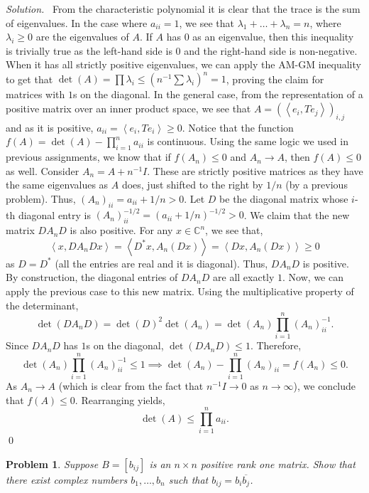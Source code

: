 \documentclass[12pt,a4paper]{article}
\newenvironment{solution}{%
  \par\noindent\textit{Solution.}\ }{\qed}
\theoremstyle{problemstyle}
\newtheorem{problem}{Problem}[section]
\def\bC{\mathbb{C}}
\newcommand{\ipp}[1]{{\left\langle{#1}\right\rangle}}
\begin{document}
\begin{solution}
    From the characteristic polynomial it is clear that the trace is the sum of eigenvalues. In the case where $a_{ii}=1$, we see that $\lambda_1+\ldots+\lambda_n=n$, where $\lambda_i\geq 0$ are the eigenvalues of $A$. 
    If $A$ has $0$ as an eigenvalue, then this inequality is trivially true as the left-hand side is $0$ and the right-hand side is non-negative. 
    When it has all strictly positive eigenvalues, we can apply the AM-GM inequality to get that $\det(A)=\prod \lambda_i \leq (n^{-1}\sum\lambda_i)^n=1$, proving the claim for matrices with $1$s on the diagonal. 
    In the general case, from the representation of a positive matrix over an inner product space, we see that $A=(\ipp{e_i,Te_j})_{i,j}$ and as it is positive, $a_{ii}=\ipp{e_i,Te_i}\geq 0$. 
    Notice that the function $f(A)=\det(A)-\prod_{i=1}^na_{ii}$ is continuous. Using the same logic we used in previous assignments, we know that if $f(A_n)\leq 0$ and $A_n\to A$, then $f(A)\leq 0$ as well. 
    Consider $A_n = A + n^{-1}I$. These are strictly positive matrices as they have the same eigenvalues as $A$ does, just shifted to the right by $1/n$ (by a previous problem). Thus, $(A_n)_{ii} = a_{ii} + 1/n > 0$.
    Let $D$ be the diagonal matrix whose $i$-th diagonal entry is $(A_n)_{ii}^{-1/2} = (a_{ii}+1/n)^{-1/2} > 0$. We claim that the new matrix $DA_nD$ is also positive. For any $x\in\bC^n$, we see that,
    \[
        \ipp{x, DA_nDx} = \ipp{D^*x, A_n(Dx)} = \ipp{Dx, A_n(Dx)} \geq 0
    \]
    as $D=D^*$ (all the entries are real and it is diagonal). Thus, $DA_nD$ is positive. By construction, the diagonal entries of $DA_nD$ are all exactly $1$. 
    Now, we can apply the previous case to this new matrix. Using the multiplicative property of the determinant,
    \[
        \det(DA_nD) = \det(D)^2\det(A_n) = \det(A_n)\prod_{i=1}^n(A_n)_{ii}^{-1}.
    \]
    Since $DA_nD$ has $1$s on the diagonal, $\det(DA_nD) \leq 1$. Therefore,
    \[
        \det(A_n)\prod_{i=1}^n(A_n)_{ii}^{-1} \leq 1 \implies \det(A_n)-\prod_{i=1}^n(A_n)_{ii} = f(A_n) \leq 0.
    \]
    As $A_n\to A$ (which is clear from the fact that $n^{-1}I\to 0$ as $n\to\infty$), we conclude that $f(A)\leq 0$. Rearranging yields,
    \[
        \det(A)\leq\prod_{i=1}^na_{ii}.
    \]
\end{solution}	
\begin{problem}\label{prob:4-3}
Suppose $B = [b_{ij}]$ is an $n \times n$ positive rank one matrix. Show that there exist complex numbers $b_1, \ldots, b_n$ such that $b_{ij} = b_i \overline{b_j}$.
\end{problem}
\end{document}
